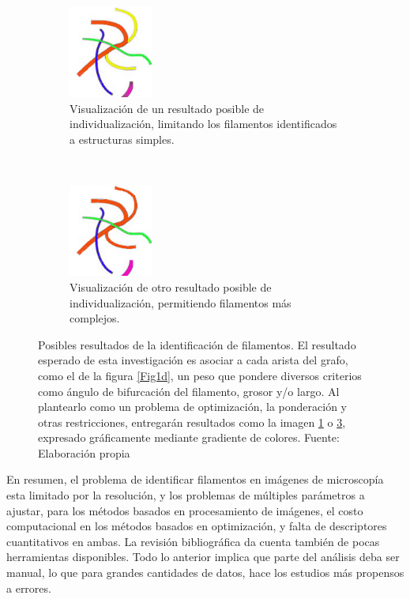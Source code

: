 \begin{intro}
\begin{figure}[h]
    \begin{subfigure}[t]{0.5\textwidth}
        \centering
        \includegraphics[height=1.2in]{imagenes/define-weighted-4-expected2.png}
        \caption{Visualizaci\'on de un resultado posible de individualizaci\'on, limitando los filamentos identificados a estructuras simples.}
        \label{Fig2a}
    \end{subfigure}
    ~ 
    \begin{subfigure}[t]{0.5\textwidth}
        \centering
        \includegraphics[height=1.2in]{imagenes/define-weighted-4-expected1.png}
        \caption{Visualizaci\'on de otro resultado posible de individualizaci\'on, permitiendo filamentos m\'as complejos.}
        \label{Fig2b}
    \end{subfigure}
	\caption{Posibles resultados de la identificaci\'on de filamentos. El resultado esperado de esta investigaci\'on es asociar a cada arista del grafo, como el de la figura \ref{Fig1d}, un peso que pondere diversos criterios como \'angulo de bifurcaci\'on del filamento, grosor y/o largo. Al plantearlo como un problema de optimizaci\'on, la ponderaci\'on y otras restricciones, entregar\'an resultados como la imagen \ref{Fig2a} o \ref{Fig2b}, expresado gr\'aficamente mediante gradiente de colores. Fuente: Elaboraci\'on propia}
\end{figure}

En resumen, el problema de identificar filamentos en im\'agenes de microscop\'ia esta limitado por la resoluci\'on, y los problemas de m\'ultiples par\'ametros a ajustar, para los m\'etodos basados en procesamiento de im\'agenes, el costo computacional en los m\'etodos basados en optimizaci\'on, y falta de descriptores cuantitativos en ambas. La revisi\'on bibliogr\'afica da cuenta tambi\'en de pocas herramientas disponibles. Todo lo anterior implica que parte del an\'alisis deba ser manual, lo que para grandes cantidades de datos, hace los estudios m\'as propensos a errores. 


\end{intro}
